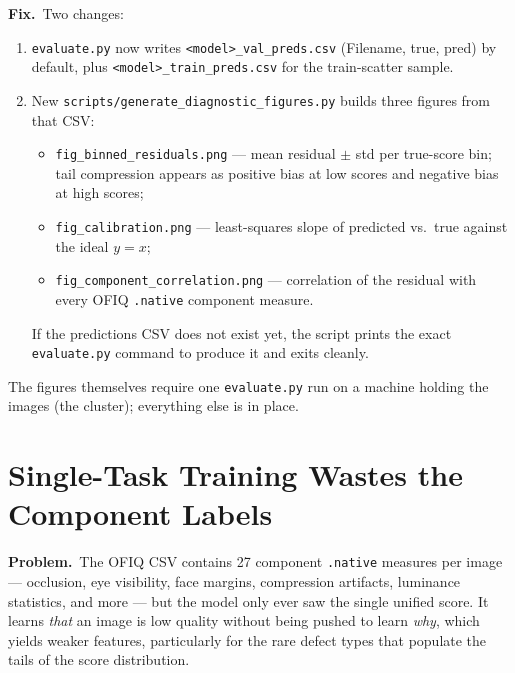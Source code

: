 \documentclass[12pt, letterpaper]{article}
\newcommand{\code}[1]{\texttt{#1}}
\newcommand{\problem}[1]{\textbf{Problem.}~#1}
\newcommand{\fix}[1]{\textbf{Fix.}~#1}
\begin{document}
\fix{Two changes:
\begin{enumerate}[leftmargin=1.6em, itemsep=1pt]
  \item \code{evaluate.py} now writes \code{<model>\_val\_preds.csv} (Filename, true,
        pred) by default, plus \code{<model>\_train\_preds.csv} for the train-scatter
        sample.
  \item New \code{scripts/generate\_diagnostic\_figures.py} builds three figures from
        that CSV:
        \begin{itemize}[leftmargin=1.4em, itemsep=1pt]
          \item \code{fig\_binned\_residuals.png} --- mean residual $\pm$ std per
                true-score bin; tail compression appears as positive bias at low
                scores and negative bias at high scores;
          \item \code{fig\_calibration.png} --- least-squares slope of predicted vs.\
                true against the ideal $y = x$;
          \item \code{fig\_component\_correlation.png} --- correlation of the residual
                with every OFIQ \code{.native} component measure.
        \end{itemize}
        If the predictions CSV does not exist yet, the script prints the exact
        \code{evaluate.py} command to produce it and exits cleanly.
\end{enumerate}
The figures themselves require one \code{evaluate.py} run on a machine holding the
images (the cluster); everything else is in place.}

\section{Single-Task Training Wastes the Component Labels}

\problem{The OFIQ CSV contains 27 component \code{.native} measures per image ---
occlusion, eye visibility, face margins, compression artifacts, luminance statistics,
and more --- but the model only ever saw the single unified score. It learns
\emph{that} an image is low quality without being pushed to learn \emph{why}, which
yields weaker features, particularly for the rare defect types that populate the
tails of the score distribution.}
\end{document}

